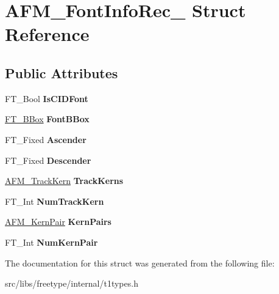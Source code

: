 \hypertarget{struct_a_f_m___font_info_rec__}{
\section{AFM\_\-FontInfoRec\_\- Struct Reference}
\label{struct_a_f_m___font_info_rec__}
}
\subsection*{Public Attributes}
\begin{DoxyCompactItemize}
\item 
\hypertarget{struct_a_f_m___font_info_rec___a6f198e74da5d8a3b7ff7518e255be231}{
FT\_\-Bool {\bfseries IsCIDFont}}
\label{struct_a_f_m___font_info_rec___a6f198e74da5d8a3b7ff7518e255be231}

\item 
\hypertarget{struct_a_f_m___font_info_rec___afa5112d6b0cc51839889206012dc1be6}{
\hyperlink{struct_f_t___b_box__}{FT\_\-BBox} {\bfseries FontBBox}}
\label{struct_a_f_m___font_info_rec___afa5112d6b0cc51839889206012dc1be6}

\item 
\hypertarget{struct_a_f_m___font_info_rec___a0b80412562435a2198a71aa4188ee85b}{
FT\_\-Fixed {\bfseries Ascender}}
\label{struct_a_f_m___font_info_rec___a0b80412562435a2198a71aa4188ee85b}

\item 
\hypertarget{struct_a_f_m___font_info_rec___a3561507200f0bc3413988af920924053}{
FT\_\-Fixed {\bfseries Descender}}
\label{struct_a_f_m___font_info_rec___a3561507200f0bc3413988af920924053}

\item 
\hypertarget{struct_a_f_m___font_info_rec___a8d9305229a1dacc15b8fceb5dbf25b9d}{
\hyperlink{struct_a_f_m___track_kern_rec__}{AFM\_\-TrackKern} {\bfseries TrackKerns}}
\label{struct_a_f_m___font_info_rec___a8d9305229a1dacc15b8fceb5dbf25b9d}

\item 
\hypertarget{struct_a_f_m___font_info_rec___a08a9207e8d4b0dd9dc0313218462f00e}{
FT\_\-Int {\bfseries NumTrackKern}}
\label{struct_a_f_m___font_info_rec___a08a9207e8d4b0dd9dc0313218462f00e}

\item 
\hypertarget{struct_a_f_m___font_info_rec___a16c5da5249d4d4f68cc169469f3ee75a}{
\hyperlink{struct_a_f_m___kern_pair_rec__}{AFM\_\-KernPair} {\bfseries KernPairs}}
\label{struct_a_f_m___font_info_rec___a16c5da5249d4d4f68cc169469f3ee75a}

\item 
\hypertarget{struct_a_f_m___font_info_rec___a8ff8af3c83fbf0b060bb711b57f1affd}{
FT\_\-Int {\bfseries NumKernPair}}
\label{struct_a_f_m___font_info_rec___a8ff8af3c83fbf0b060bb711b57f1affd}

\end{DoxyCompactItemize}


The documentation for this struct was generated from the following file:\begin{DoxyCompactItemize}
\item 
src/libs/freetype/internal/t1types.h\end{DoxyCompactItemize}
